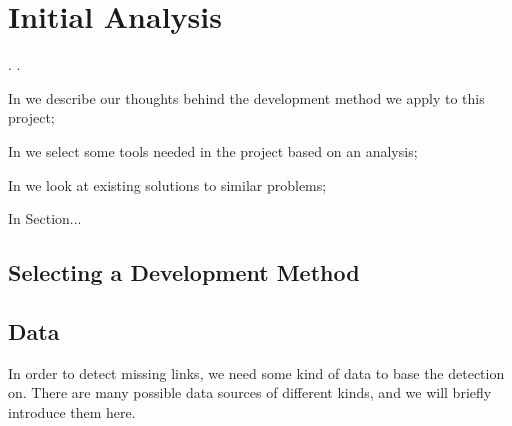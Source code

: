 \chapter{Initial Analysis}\label{chap:analysis}
\dummy . \dummy .

\begin{chapterorganization}
  \item In  we describe our thoughts behind the development method we apply to this project;
  \item In  we select some tools needed in the project based on an analysis;
  \item In  we look at existing solutions to similar problems;
  \item In Section...
\end{chapterorganization}

\section{Selecting a Development Method}\label{sec:selecting_devmethod}

\section{Data}
In order to detect missing links, we need some kind of data to base the detection on. There are many possible data sources of different kinds, and we will briefly introduce them here.

